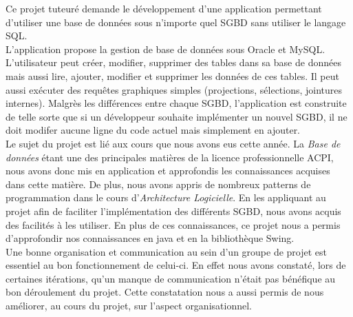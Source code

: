 Ce projet tuteuré demande le développement d’une application permettant d’utiliser une base de données sous n'importe quel SGBD sans utiliser le langage SQL.\\

L'application propose la gestion de base de données sous Oracle et MySQL. L'utilisateur peut créer, modifier, supprimer des tables dans sa base de données mais aussi lire, ajouter, modifier et supprimer les données de ces tables. Il peut aussi exécuter des requêtes graphiques simples (projections, sélections, jointures internes). Malgrès les différences entre chaque SGBD, l'application est construite de telle sorte que si un développeur souhaite implémenter un nouvel SGBD, il ne doit modifer aucune ligne du code actuel mais simplement en ajouter.\\

Le sujet du projet est lié aux cours que nous avons eus cette année. La \textit{Base de données} étant une des principales matières de la licence professionnelle ACPI, nous avons donc mis en application et approfondis les connaissances acquises dans cette matière. De plus, nous avons appris de nombreux patterns de programmation dans le cours d'\textit{Architecture Logicielle}. 
En les appliquant au projet afin de faciliter l'implémentation des différents SGBD, nous avons acquis des facilités à les utiliser. En plus de ces connaissances, ce projet nous a permis d'approfondir nos connaissances en java et en la bibliothèque Swing. \\

Une bonne organisation et communication au sein d'un groupe de projet est essentiel au bon fonctionnement de celui-ci. En effet nous avons constaté, lors de certaines itérations, qu'un manque de communication n'était pas bénéfique au bon déroulement du projet. Cette constatation nous a aussi permis de nous améliorer, au cours du projet, sur l'aspect organisationnel.